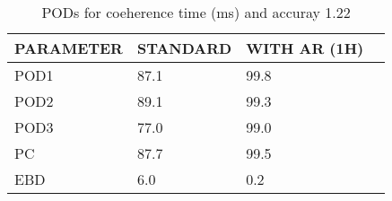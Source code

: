 \begin{table}[]
\begin{center}
\begin{tabular}{|l|l|l|l|}
\hline
\multicolumn{1}{|c|}{\cellcolor[HTML]{C0C0C0}\textbf{PARAMETER}} & \multicolumn{1}{c|}{\cellcolor[HTML]{C0C0C0}\textbf{STANDARD}} & \multicolumn{1}{c|}{\cellcolor[HTML]{C0C0C0}\textbf{WITH AR (1H)}} \\
\hline
\cellcolor[HTML]{C0C0C0}POD1  & 87.1                                & 99.8         \\
\cellcolor[HTML]{C0C0C0}POD2  & 89.1                                & 99.3         \\
\cellcolor[HTML]{C0C0C0}POD3  & 77.0                                & 99.0         \\
\cellcolor[HTML]{C0C0C0}PC    & 87.7                                  & 99.5           \\
\cellcolor[HTML]{C0C0C0}EBD   & 6.0                                 & 0.2          \\
\hline
\end{tabular}
\caption{PODs for coeherence time (ms) and accuray 1.22}
\end{center}
\end{table}
